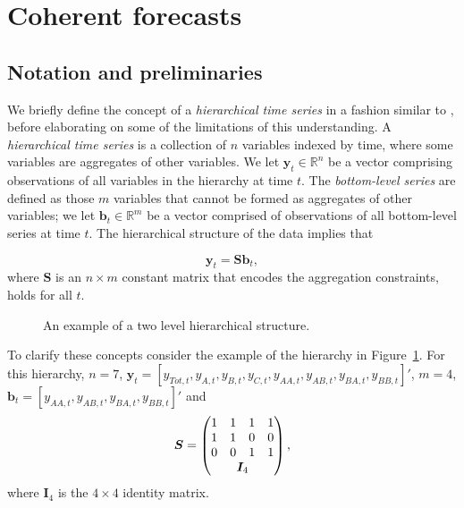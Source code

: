 \documentclass[12pt]{article}
\theoremstyle{definition}
\theoremstyle{property}
\begin{document}
\section{Coherent forecasts}\label{sec:CoheForecasts}
	
	\subsection{Notation and preliminaries}\label{sec:notation}
	
    We briefly define the concept of a \emph{hierarchical time series} in a fashion similar to , before elaborating on some of the limitations of this understanding.  A \emph{hierarchical time series} is a collection of $n$ variables indexed by time, where some variables are aggregates of other variables. We let $\bm{y}_t \in \mathbb{R}^n$ be a vector comprising observations of all variables in the hierarchy at time $t$. The \emph{bottom-level series} are defined as those $m$ variables that cannot be formed as aggregates of other variables; we let $\bm{b}_t \in \mathbb{R}^m$ be a vector comprised of observations of all bottom-level series at time $t$.  The hierarchical structure of the data implies that 
    
    \begin{equation}
    \bm{y}_t = \bm{Sb}_t,
    \end{equation}
    where $\bm{S}$ is an $n \times m$ constant matrix that encodes the aggregation constraints, holds for all $t$.  
	
		\begin{figure}[H]
			\begin{center}
				 
				 
				\qobitree
			\end{center}
			\caption{An example of a two level hierarchical structure.}\label{fig:basichier}
		\end{figure}
	
	To clarify these concepts consider the example of the hierarchy in Figure~\ref{fig:basichier}.  For this hierarchy, $n=7$, $\bm{y}_t = [y_{Tot,t},y_{A,t}, y_{B,t},y_{C,t},y_{AA,t}, y_{AB,t}, y_{BA,t}, y_{BB,t}]'$, $m=4$, $\bm{b}_t = [y_{AA,t}, y_{AB,t}, y_{BA,t}, y_{BB,t}]'$ and
	\[
	\bm{S} = \begin{pmatrix}
	1 & 1 & 1 & 1  \\
	1 & 1 & 0 & 0 \\
	0 & 0 & 1 & 1 \\
	& \multicolumn{2}{c}{\bm{I}_4} &
	\end{pmatrix},
	\]
	where $\bm{I}_4$ is the $4\times 4$ identity matrix.
	
\end{document}
